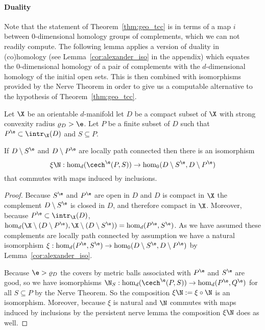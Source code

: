 \paragraph{Duality}

Note that the statement of Theorem~\ref{thm:geo_tcc} is in terms of a map $i$ between $0$-dimensional homology groups of complements, which we can not readily compute.
The following lemma applies a version of duality in (co)homology (see Lemma~\ref{cor:alexander_iso} in the appendix) which equates the $0$-dimensional homology of a pair of complements with the $d$-dimensional homology of the initial open sets.
This is then combined with isomorphisms provided by the Nerve Theorem in order to give us a computable alternative to the hypothesis of Theorem~\ref{thm:geo_tcc}.

\begin{lemma}\label{lem:duality_apply}
  Let $\X$ be an orientable $d$-manifold let $D$ be a compact subset of $\X$ with strong convexity radius $\varrho_D > \e$.
  Let $P$ be a finite subset of $D$ such that $P^\e\subset \intr_\X(D)$ and $S\subseteq P$.

  If $D\setminus S^\e$ and $D\setminus P^\e$ are locally path connected then there is an isomorphism
  \[ \xi\N : \hom_d(\cech^\e(P,S))\to \hom_0(D\setminus S^\e, D\setminus P^\e)\]
  that commutes with maps induced by inclusions.
\end{lemma}
\begin{proof}
  Because $S^\e$ and $P^\e$ are open in $D$ and $D$ is compact in $\X$ the complement $D\setminus S^\e$ is closed in $D$, and therefore compact in $\X$.
  Moreover, because $P^\e\subset \intr_\X(D)$, $\hom_d(\X\setminus(D\setminus P^\e), \X\setminus(D\setminus S^\e)) = \hom_d(P^\e, S^\e)$.
  As we have assumed these complements are locally path connected by assumption we have a natural isomorphism $\xi : \hom_d(P^\e, S^\e)\to \hom_0(D\setminus S^\e, D\setminus P^\e)$
  by Lemma~\ref{cor:alexander_iso}.

  Because $\e > \varrho_D$ the covers by metric balls associated with $P^\e$ and $S^\e$ are good, so we have isomorphisms $\N_S : \hom_d(\cech^\e(P, S))\to \hom_d(P^\e, Q^\e)$ for all $S\subseteq P$ by the Nerve Theorem.
  So the composition $\xi\N := \xi\circ\N$ is an isomorphism.
  Moreover, because $\xi$ is natural and $\N$ commutes with maps induced by inclusions by the persistent nerve lemma the composition $\xi\N$ does as well.
\end{proof}

